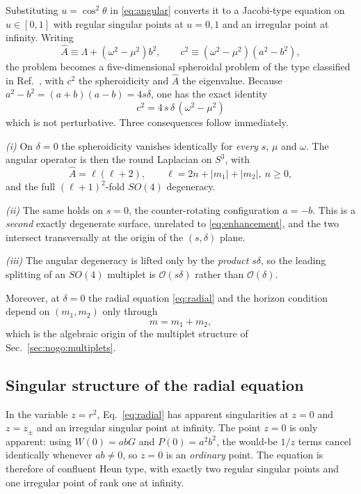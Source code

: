 \documentclass[aps,prd,reprint,superscriptaddress,nofootinbib,longbibliography]{revtex4-2}
\theoremstyle{plain}
\theoremstyle{definition}
\theoremstyle{remark}
\newcommand{\Ord}{\mathcal{O}}
\begin{document}
Substituting $u=\cos^2\!\theta$ in \eqref{eq:angular} converts it to a
Jacobi-type equation on $u\in[0,1]$ with regular singular points at $u=0,1$ and
an irregular point at infinity. Writing
\begin{equation}\label{eq:Ahatc2}
  \hat A \equiv \Lambda + (\omega^2-\mu^2)b^2,\qquad
  c^2 \equiv (\omega^2-\mu^2)(a^2-b^2),
\end{equation}
the problem becomes a five-dimensional spheroidal problem of the type
classified in Ref.~\cite{Berti2005A05}, with $c^2$ the spheroidicity and $\hat A$
the eigenvalue. Because $a^2-b^2=(a+b)(a-b)=4s\delta$, one has the exact
identity
\begin{equation}\label{eq:c2exact}
  \boxed{\;c^2 = 4\,s\,\delta\,(\omega^2-\mu^2)\;}
\end{equation}
which is not perturbative. Three consequences follow immediately.

\emph{(i)} On $\delta=0$ the spheroidicity vanishes identically for
\emph{every} $s$, $\mu$ and $\omega$. The angular operator is then the round
Laplacian on $S^3$, with
\begin{equation}\label{eq:Lambdaround}
  \hat A = \ell(\ell+2),\qquad \ell = 2n+|m_1|+|m_2|,\ n\ge0 ,
\end{equation}
and the full $(\ell+1)^2$-fold $SO(4)$ degeneracy.

\emph{(ii)} The same holds on $s=0$, the counter-rotating configuration
$a=-b$. This is a \emph{second} exactly degenerate surface, unrelated to
\eqref{eq:enhancement}, and the two intersect transversally at the origin of
the $(s,\delta)$ plane.

\emph{(iii)} The angular degeneracy is lifted only by the \emph{product}
$s\delta$, so the leading splitting of an $SO(4)$ multiplet is
$\Ord(s\delta)$ rather than $\Ord(\delta)$.

Moreover, at $\delta=0$ the radial equation \eqref{eq:radial} and the horizon
condition depend on $(m_1,m_2)$ only through
\begin{equation}\label{eq:mtotal}
  m = m_1+m_2 ,
\end{equation}
which is the algebraic origin of the multiplet structure of
Sec.~\ref{sec:nogo:multiplets}.

\subsection{Singular structure of the radial equation}\label{sec:sep:singular}

In the variable $z=r^2$, Eq.~\eqref{eq:radial} has apparent singularities at
$z=0$ and $z=z_\pm$ and an irregular singular point at infinity. The point
$z=0$ is only apparent: using $W(0)=abG$ and $P(0)=a^2b^2$, the would-be $1/z$
terms cancel identically whenever $ab\ne0$, so $z=0$ is an \emph{ordinary}
point. The equation is therefore of confluent Heun type, with exactly two
regular singular points and one irregular point of rank one at infinity.
\end{document}
